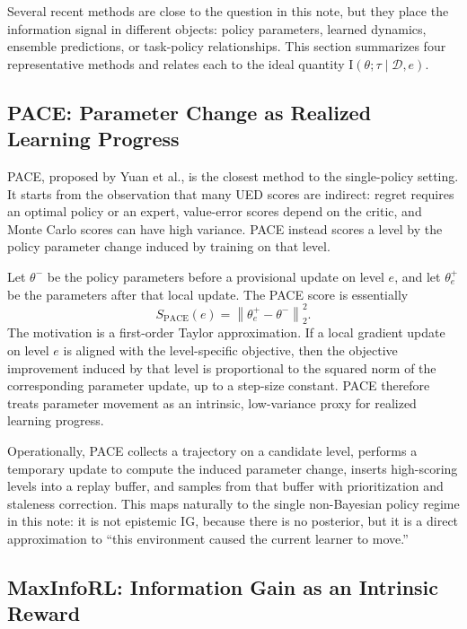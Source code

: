 \documentclass[11pt]{article}
\newcommand{\D}{\mathcal{D}}
\newcommand{\I}{\mathrm{I}}
\begin{document}
Several recent methods are close to the question in this note, but they place
the information signal in different objects: policy parameters, learned dynamics,
ensemble predictions, or task-policy relationships. This section summarizes four
representative methods and relates each to the ideal quantity
$\I(\theta;\tau \mid \D,e)$.

\subsection{PACE: Parameter Change as Realized Learning Progress}

PACE, proposed by Yuan et al., is the closest method to the single-policy
setting. It starts from the observation that many UED scores are indirect:
regret requires an optimal policy or an expert, value-error scores depend on the
critic, and Monte Carlo scores can have high variance. PACE instead scores a
level by the policy parameter change induced by training on that level.

Let $\theta^-$ be the policy parameters before a provisional update on level
$e$, and let $\theta_e^+$ be the parameters after that local update. The PACE
score is essentially
\begin{equation}
  S_{\mathrm{PACE}}(e)
  =
  \left\lVert \theta_e^+ - \theta^- \right\rVert_2^2.
\end{equation}
The motivation is a first-order Taylor approximation. If a local gradient update
on level $e$ is aligned with the level-specific objective, then the objective
improvement induced by that level is proportional to the squared norm of the
corresponding parameter update, up to a step-size constant. PACE therefore treats
parameter movement as an intrinsic, low-variance proxy for realized learning
progress.

Operationally, PACE collects a trajectory on a candidate level, performs a
temporary update to compute the induced parameter change, inserts high-scoring
levels into a replay buffer, and samples from that buffer with prioritization and
staleness correction. This maps naturally to the single non-Bayesian policy
regime in this note: it is not epistemic IG, because there is no posterior, but
it is a direct approximation to ``this environment caused the current learner to
move.''

\subsection{MaxInfoRL: Information Gain as an Intrinsic Reward}
\end{document}
